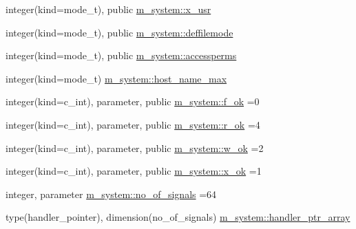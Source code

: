 \begin{DoxyCompactItemize}
\item 
integer(kind=mode\+\_\+t), public \mbox{\hyperlink{namespacem__system_a450a3fddafad75b241f370b47b17d97c}{m\+\_\+system\+::x\+\_\+usr}}
\item 
integer(kind=mode\+\_\+t), public \mbox{\hyperlink{namespacem__system_a04a5b1ef384bcbb8ad3b0c81ce95001a}{m\+\_\+system\+::deffilemode}}
\item 
integer(kind=mode\+\_\+t), public \mbox{\hyperlink{namespacem__system_a82a13cb7ac2c5f0e6e34fc3cfc010d42}{m\+\_\+system\+::accessperms}}
\item 
integer(kind=mode\+\_\+t) \mbox{\hyperlink{namespacem__system_a6501a3671053239dae9b69b95c0a5f55}{m\+\_\+system\+::host\+\_\+name\+\_\+max}}
\item 
integer(kind=c\+\_\+int), parameter, public \mbox{\hyperlink{namespacem__system_ad34c4f18dd5b7dbe445cca25bbae9a74}{m\+\_\+system\+::f\+\_\+ok}} =0
\item 
integer(kind=c\+\_\+int), parameter, public \mbox{\hyperlink{namespacem__system_a86ca380e22d30a8795b4d99f1836ece8}{m\+\_\+system\+::r\+\_\+ok}} =4
\item 
integer(kind=c\+\_\+int), parameter, public \mbox{\hyperlink{namespacem__system_a8f34e61e94106b90ca48b9ef1165474c}{m\+\_\+system\+::w\+\_\+ok}} =2
\item 
integer(kind=c\+\_\+int), parameter, public \mbox{\hyperlink{namespacem__system_a0eca0d5b431ad6fbde6f40407550e7aa}{m\+\_\+system\+::x\+\_\+ok}} =1
\item 
integer, parameter \mbox{\hyperlink{namespacem__system_a4a9ba51ff75a0a6176f31e0562d0a058}{m\+\_\+system\+::no\+\_\+of\+\_\+signals}} =64
\item 
type(handler\+\_\+pointer), dimension(no\+\_\+of\+\_\+signals) \mbox{\hyperlink{namespacem__system_a2da68c4639de85352f306b0e39debf77}{m\+\_\+system\+::handler\+\_\+ptr\+\_\+array}}
\end{DoxyCompactItemize}
